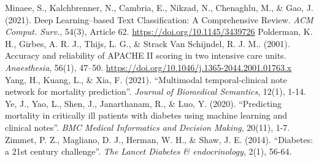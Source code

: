 \documentclass{sigkddExp}
\begin{document}
\begin{thebibliography}{6}
       Minaee, S., Kalchbrenner, N., Cambria, E., Nikzad, N., Chenaghlu, M., \& Gao, J. (2021). Deep Learning--based Text Classification: A Comprehensive Review. \textit{ACM Comput. Surv.}, 54(3), Article 62. \url{https://doi.org/10.1145/3439726}
       Polderman, K. H., Girbes, A. R. J., Thijs, L. G., \& Strack Van Schijndel, R. J. M.. (2001). Accuracy and reliability of APACHE II scoring in two intensive care units. \textit{Anaesthesia}, 56(1), 47–50. \url{https://doi.org/10.1046/j.1365-2044.2001.01763.x}
       Yang, H., Kuang, L., \& Xia, F. (2021). ``Multimodal temporal-clinical note network for mortality prediction''. \textit{Journal of Biomedical Semantics}, 12(1), 1-14.
       Ye, J., Yao, L., Shen, J., Janarthanam, R., \& Luo, Y. (2020). ``Predicting mortality in critically ill patients with diabetes using machine learning and clinical notes''. \textit{BMC Medical Informatics and Decision Making}, 20(11), 1-7.
       Zimmet, P. Z., Magliano, D. J., Herman, W. H., \& Shaw, J. E. (2014). ``Diabetes: a 21st century challenge''. \textit{The Lancet Diabetes \& endocrinology}, 2(1), 56-64.

\end{thebibliography}
              
\end{document}
